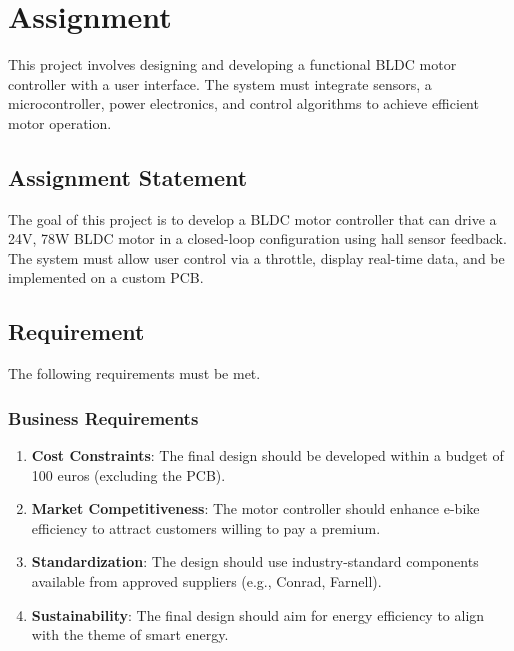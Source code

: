 \section{Assignment}
This project involves designing and developing a functional BLDC motor controller with a user interface. The system must integrate sensors, a microcontroller, power electronics, and control algorithms to achieve efficient motor operation.

\subsection{Assignment Statement}
The goal of this project is to develop a BLDC motor controller that can drive a 24V, 78W BLDC motor in a closed-loop configuration using hall sensor feedback. The system must allow user control via a throttle, display real-time data, and be implemented on a custom PCB.

\subsection{Requirement}
The following requirements must be met.


\subsubsection{Business Requirements}
\begin{enumerate}[label=B\arabic*.]
    \item \textbf{Cost Constraints}: The final design should be developed within a budget of 100 euros (excluding the PCB).
    \item \textbf{Market Competitiveness}: The motor controller should enhance e-bike efficiency to attract customers willing to pay a premium.
    \item \textbf{Standardization}: The design should use industry-standard components available from approved suppliers (e.g., Conrad, Farnell).
    \item \textbf{Sustainability}: The final design should aim for energy efficiency to align with the theme of smart energy.
\end{enumerate}

